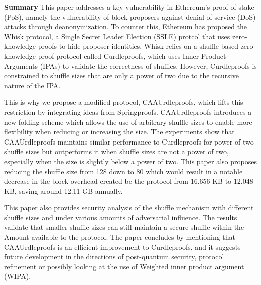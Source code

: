 \thispagestyle{empty}
\textbf{\large Summary}
This paper addresses a key vulnerability in Ethereum’s proof-of-stake (PoS), namely the vulnerability of block proposers against denial-of-service (DoS) attacks through deanonymization.
To counter this, Ethereum has proposed the Whisk protocol, a Single Secret Leader Election (SSLE) protcol that uses zero-knowledge proofs to hide proposer identities.
Whisk relies on a shuffle-based zero-knowledge proof protocol called Curdleproofs, which uses Inner Product Arguments (IPAs) to validate the correctness of shuffles.
However, Curdleproofs is constrained to shuffle sizes that are only a power of two due to the recursive nature of the IPA.


This is why we propose a modified protocol, CAAUrdleproofs, which lifts this restriction by integrating ideas from Springproofs.
CAAUrdleproofs introduces a new folding scheme which allows the use of arbitrary shuffle sizes to enable more flexibility when reducing or increasing the size.
The experiments show that CAAUrdleproofs maintains similar performance to Curdleproofs for power of two shuffle sizes but outperforms it when shuffle sizes are not a power of two, especially when the size is slightly below a power of two.
This paper also proposes reducing the shuffle size from 128 down to 80 which would result in a notable decrease in the block overhead created be the protocol from 16.656 KB to 12.048 KB, saving around 12.11 GB annually.


This paper also provides security analysis of the shuffle mechanism with different shuffle sizes and under various amounts of adversarial influence.
The results validate that smaller shuffle sizes can still maintain a secure shuffle within the Amount available to the protocol.
The paper concludes by mentioning that CAAUrdleproofs is an efficient improvement to Curdleproofs, and it suggests future development in the directions of post-quantum security, protocol refinement or possibly looking at the use of Weighted inner product argument (WIPA).


